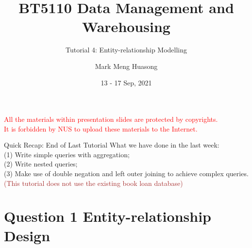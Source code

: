 \title{BT5110 Data Management and Warehousing}

\subtitle{Tutorial 4: Entity-relationship Modelling}

\author{Mark Meng Huasong}



\date{13 - 17 Sep, 2021}

\begin{frame}
	\titlepage
	\begin{tcolorbox}
		\begin{center}
			{\scriptsize \textcolor{red}{All the materials within presentation slides are protected by copyrights.\\
					It is forbidden by NUS to upload these materials to the Internet.}}
		\end{center}
	\end{tcolorbox}
\end{frame}

\begin{frame}[fragile]{Quick Recap: End of Last Tutorial}
	What we have done in the last week:\\\vspace{5pt}
	(1) Write simple queries with aggregation;\\
	(2) Write nested queries;\\
	(3) Make use of double negation and left outer joining to achieve complex queries. \\\vspace{5pt}
	\textcolor{brown}{(This tutorial does not use the existing book loan database)}
\end{frame}

\section*{Question 1 Entity-relationship Design}

